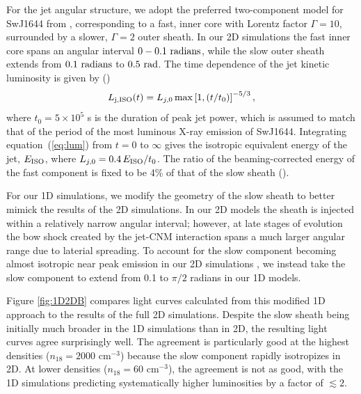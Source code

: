 \documentclass[usenatbib,fleqn]{mnras}
\begin{document}
For the jet angular structure, we adopt the preferred two-component
model for SwJ1644 from \citet{Mimica+2015}, corresponding to a fast,
inner core with Lorentz factor $\Gamma = 10$, surrounded by a slower,
$\Gamma=2$ outer sheath.  In our 2D simulations the fast inner core
spans an angular interval $0-0.1\ {\rm radians}$, while the slow outer
sheath extends from $0.1\ {\rm radians}$ to $0.5\ {\rm rad}$.  The
time dependence of the jet kinetic luminosity is given by
(\citealt{Mimica+2015})
\begin{equation}\label{eq:lum}
L_{\rm j, ISO}(t) = L_{j,0}\max\left[1, (t/t_0)\right]^{-5/3},
\end{equation}
where $t_0 = 5\times 10^5$ s is the duration of peak jet power, which
is assumed to match that of the period of the most luminous X-ray
emission of SwJ1644.  Integrating equation~(\ref{eq:lum}) from $t = 0$
to $\infty$ gives the isotropic equivalent energy of the jet, $E_{\rm
  ISO}$, where $L_{j,0}=0.4\, E_{\rm ISO}/t_0$.  The ratio of the
beaming-corrected energy of the fast component is fixed to be 4\% of
that of the slow sheath (\citealt{Mimica+2015}).

For our 1D simulations, we modify the geometry of the slow sheath to
better mimick the results of the 2D simulations.  In our 2D models the
sheath is injected within a relatively narrow angular interval;
however, at late stages of evolution the bow shock created by the
jet-CNM interaction spans a much larger angular range due to laterial
spreading.  To account for the slow component becoming almost
isotropic near peak emission in our 2D simulations \citep[bottom two
panels of Fig.~8 in][]{Mimica+2015}, we instead take the slow
component to extend from 0.1 to $\pi/2$ radians in our 1D models.

Figure \ref{fig:1D2DB} compares light curves calculated from this
modified 1D approach to the results of the full 2D simulations.
Despite the slow sheath being initially much broader in the 1D
simulations than in 2D, the resulting light curves agree surprisingly
well.  The agreement is particularly good at the highest densities
($n_{18}=2000$ cm$^{-3}$) because the slow component rapidly
isotropizes in 2D.  At lower densities ($n_{18}=60$ cm$^{-3}$), the agreement is not
as good, with the 1D simulations predicting systematically higher
luminosities by a factor of $\lesssim 2$.

\end{document}

